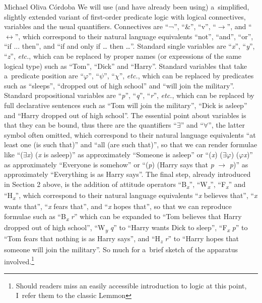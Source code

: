 \begin{artengenv}{Michael Oliva Córdoba}
We will use (and have already been using) a~simplified, slightly extended variant of first-order predicate logic with logical connectives, variables and the usual quantifiers. Connectives are ``¬'', ``\&'', ``v'', ``$\to$'', and ``$\leftrightarrow$'', which correspond to their natural language equivalents ``not'', ``and'', ``or'', ``if ... then'', and ``if and only if … then …''. Standard single variables are ``\textit{x}'', ``\textit{y}'', ``\textit{z}'', \textit{etc.}, which can be replaced by proper names (or expressions of the same logical type) such as ``Tom'', ``Dick'' and ``Harry''. Standard variables that take a~predicate position are ``\textit{$\varphi $}'', ``\textit{$\psi $}'', ``\textit{$\chi $}'', \textit{etc.}, which can be replaced by predicates such as ``sleeps'', ``dropped out of high school'' and ``will join the military''. Standard propositional variables are ``\textit{p}'', ``\textit{q}'', ``\textit{r}'', \textit{etc.}, which can be replaced by full declarative sentences such as ``Tom will join the military'', ``Dick is asleep'' and ``Harry dropped out of high school''. The essential point about variables is that they can be bound, thus there are the quantifiers ``${\exists}$'' and ``${\forall}$'', the latter symbol often omitted, which correspond to their natural language equivalents ``at least one (is such that)'' and ``all (are such that)'', so that we can render formulae like ``(${\exists}$\textit{x}) (\textit{x} is asleep)'' as approximately ``Someone is asleep'' or ``(\textit{x}) (${\exists}$\textit{$\varphi $}) (\textit{$\varphi $x})'' as approximately ``Everyone is somehow'' or ``(\textit{p}) (Harry says that \textit{p} $\to$ \textit{p})'' as approximately ``Everything is as Harry says''. The final step, already introduced in Section 2 above, is the addition of attitude operators ``B\textit{\textsubscript{x}}'', ``W\textit{\textsubscript{x}}'', ``F\textit{\textsubscript{x}}'' and ``H\textit{\textsubscript{x}}'', which correspond to their natural language equivalents ``\textit{x} believes that'', ``\textit{x} wants that'', ``\textit{x} fears that'', and ``\textit{x} hopes that'', so that we can reproduce formulae such as ``B\textit{\textsubscript{x}} \textit{r}'' which can be expanded to ``Tom believes that Harry dropped out of high school'', ``W\textit{\textsubscript{y}} \textit{q}'' to ``Harry wants Dick to sleep'', ``F\textit{\textsubscript{x}} \textit{p}'' to ``Tom fears that nothing is as Harry says'', and ``H\textit{\textsubscript{z}} \textit{r}'' to ``Harry hopes that someone will join the military''. So much for a~brief sketch of the apparatus involved.\footnote{Should readers miss an easily accessible introduction to logic at this point, I~refer them to the classic Lemmon 
}
\end{artengenv}
